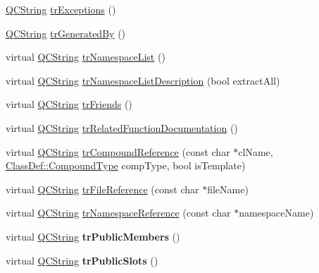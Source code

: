 \begin{DoxyCompactItemize}
\item 
\hyperlink{class_q_c_string}{Q\-C\-String} \hyperlink{class_translator_portuguese_afd184af42e35d6ef611899532f80935c}{tr\-Exceptions} ()
\item 
\hyperlink{class_q_c_string}{Q\-C\-String} \hyperlink{class_translator_portuguese_a131935c84cc3cc61a5b62f41619cb163}{tr\-Generated\-By} ()
\item 
virtual \hyperlink{class_q_c_string}{Q\-C\-String} \hyperlink{class_translator_portuguese_ae958060c87ca1439cfe719469641a0b8}{tr\-Namespace\-List} ()
\item 
virtual \hyperlink{class_q_c_string}{Q\-C\-String} \hyperlink{class_translator_portuguese_aeb5226ccdd672b54940c1705029367da}{tr\-Namespace\-List\-Description} (bool extract\-All)
\item 
virtual \hyperlink{class_q_c_string}{Q\-C\-String} \hyperlink{class_translator_portuguese_a77493be94d937cfe7458c6317d792eb6}{tr\-Friends} ()
\item 
virtual \hyperlink{class_q_c_string}{Q\-C\-String} \hyperlink{class_translator_portuguese_a5b5913d0d888aaca721ef5a67333bad1}{tr\-Related\-Function\-Documentation} ()
\item 
virtual \hyperlink{class_q_c_string}{Q\-C\-String} \hyperlink{class_translator_portuguese_ae4c559d830de6436ef53c6ebcc3b1849}{tr\-Compound\-Reference} (const char $\ast$cl\-Name, \hyperlink{class_class_def_a768a6f0a6fd7e9087ff7971abbcc3f36}{Class\-Def\-::\-Compound\-Type} comp\-Type, bool is\-Template)
\item 
virtual \hyperlink{class_q_c_string}{Q\-C\-String} \hyperlink{class_translator_portuguese_ab97b8df22dd810e2260a8cb9b06febbb}{tr\-File\-Reference} (const char $\ast$file\-Name)
\item 
virtual \hyperlink{class_q_c_string}{Q\-C\-String} \hyperlink{class_translator_portuguese_a6014867d291ed13bd505e90304b3f7ba}{tr\-Namespace\-Reference} (const char $\ast$namespace\-Name)
\item 
\hypertarget{class_translator_portuguese_aa766ee4ea863124dbd2c2cbfe8f615f6}{virtual \hyperlink{class_q_c_string}{Q\-C\-String} {\bfseries tr\-Public\-Members} ()}\label{class_translator_portuguese_aa766ee4ea863124dbd2c2cbfe8f615f6}

\item 
\hypertarget{class_translator_portuguese_a00352dfc34ae1206bd8572a9c477b8df}{virtual \hyperlink{class_q_c_string}{Q\-C\-String} {\bfseries tr\-Public\-Slots} ()}\label{class_translator_portuguese_a00352dfc34ae1206bd8572a9c477b8df}


\end{DoxyCompactItemize}
